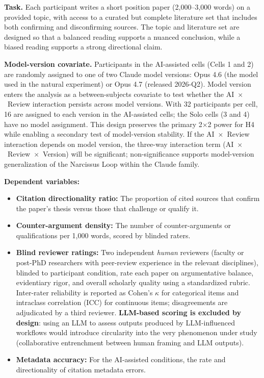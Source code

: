 \documentclass[12pt]{article}
\begin{document}
\textbf{Task.} Each participant writes a short position paper (2,000--3,000 words) on a provided topic, with access to a curated but complete literature set that includes both confirming and disconfirming sources. The topic and literature set are designed so that a balanced reading supports a nuanced conclusion, while a biased reading supports a strong directional claim.

\textbf{Model-version covariate.} Participants in the AI-assisted cells (Cells 1 and 2) are randomly assigned to one of two Claude model versions: Opus 4.6 (the model used in the natural experiment) or Opus 4.7 (released 2026-Q2). Model version enters the analysis as a between-subjects covariate to test whether the AI~$\times$~Review interaction persists across model versions. With 32 participants per cell, 16 are assigned to each version in the AI-assisted cells; the Solo cells (3 and 4) have no model assignment. This design preserves the primary 2$\times$2 power for H4 while enabling a secondary test of model-version stability. If the AI~$\times$~Review interaction depends on model version, the three-way interaction term (AI~$\times$~Review~$\times$~Version) will be significant; non-significance supports model-version generalization of the Narcissus Loop within the Claude family.

\textbf{Dependent variables:}
\begin{itemize}
    \item \textbf{Citation directionality ratio:} The proportion of cited sources that confirm the paper's thesis versus those that challenge or qualify it.
    \item \textbf{Counter-argument density:} The number of counter-arguments or qualifications per 1,000 words, scored by blinded raters.
    \item \textbf{Blind reviewer ratings:} Two independent \emph{human} reviewers (faculty or post-PhD researchers with peer-review experience in the relevant disciplines), blinded to participant condition, rate each paper on argumentative balance, evidentiary rigor, and overall scholarly quality using a standardized rubric. Inter-rater reliability is reported as Cohen's $\kappa$ for categorical items and intraclass correlation (ICC) for continuous items; disagreements are adjudicated by a third reviewer. \textbf{LLM-based scoring is excluded by design}: using an LLM to assess outputs produced by LLM-influenced workflows would introduce circularity into the very phenomenon under study (collaborative entrenchment between human framing and LLM outputs).
    \item \textbf{Metadata accuracy:} For the AI-assisted conditions, the rate and directionality of citation metadata errors.
\end{itemize}
\end{document}

